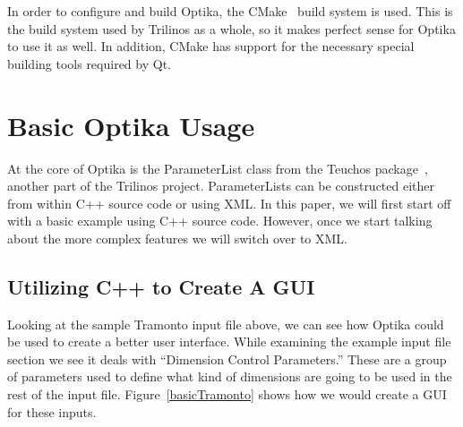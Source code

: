 In order to configure and build Optika, the CMake~\cite{cmake} build system is used. This is the build system
used by Trilinos as a whole, so it makes perfect sense for Optika to use it as well. In addition, CMake
has support for the necessary special building tools required by Qt.

\section{Basic Optika Usage}
At the core of Optika is the ParameterList class from the Teuchos package~\cite{TeuchosPackage}, another part
of the Trilinos project. ParameterLists can be constructed either from within C++ source code or using XML.
In this paper, we will first start off with a basic example using C++ source code. However, once we start
talking about the more complex features we will switch over to XML.
\subsection{Utilizing C++ to Create A GUI}
Looking at the sample Tramonto input file above, we can see how Optika could be used to create a better user interface.
While examining the example input file section we see it deals with ``Dimension Control Parameters.'' These are a group of parameters 
used to define what kind of dimensions are going to be used in the rest of the input file. Figure~\ref{basicTramonto} shows how we would create
a GUI for these inputs.


